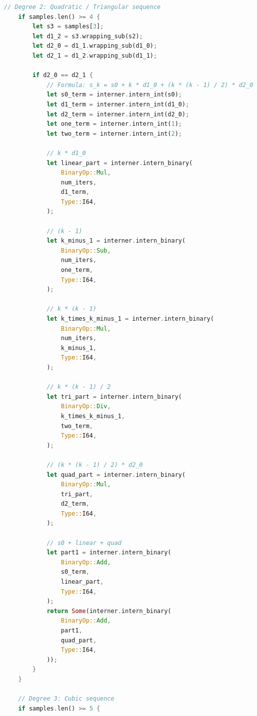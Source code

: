 \begin{lstlisting}[language=Rust, caption={Anti-Unification and Knot Materialization (\texttt{src/mir/supercompiler/generalize.rs}).}, label={lst:generalize_impl}]
    // Degree 2: Quadratic / Triangular sequence
    if samples.len() >= 4 {
        let s3 = samples[3];
        let d1_2 = s3.wrapping_sub(s2);
        let d2_0 = d1_1.wrapping_sub(d1_0);
        let d2_1 = d1_2.wrapping_sub(d1_1);

        if d2_0 == d2_1 {
            // Formula: s_k = s0 + k * d1_0 + (k * (k - 1) / 2) * d2_0
            let s0_term = interner.intern_int(s0);
            let d1_term = interner.intern_int(d1_0);
            let d2_term = interner.intern_int(d2_0);
            let one_term = interner.intern_int(1);
            let two_term = interner.intern_int(2);

            // k * d1_0
            let linear_part = interner.intern_binary(
                BinaryOp::Mul,
                num_iters,
                d1_term,
                Type::I64,
            );

            // (k - 1)
            let k_minus_1 = interner.intern_binary(
                BinaryOp::Sub,
                num_iters,
                one_term,
                Type::I64,
            );

            // k * (k - 1)
            let k_times_k_minus_1 = interner.intern_binary(
                BinaryOp::Mul,
                num_iters,
                k_minus_1,
                Type::I64,
            );

            // k * (k - 1) / 2
            let tri_part = interner.intern_binary(
                BinaryOp::Div,
                k_times_k_minus_1,
                two_term,
                Type::I64,
            );

            // (k * (k - 1) / 2) * d2_0
            let quad_part = interner.intern_binary(
                BinaryOp::Mul,
                tri_part,
                d2_term,
                Type::I64,
            );

            // s0 + linear + quad
            let part1 = interner.intern_binary(
                BinaryOp::Add,
                s0_term,
                linear_part,
                Type::I64,
            );
            return Some(interner.intern_binary(
                BinaryOp::Add,
                part1,
                quad_part,
                Type::I64,
            ));
        }
    }

    // Degree 3: Cubic sequence
    if samples.len() >= 5 {

\end{lstlisting}
